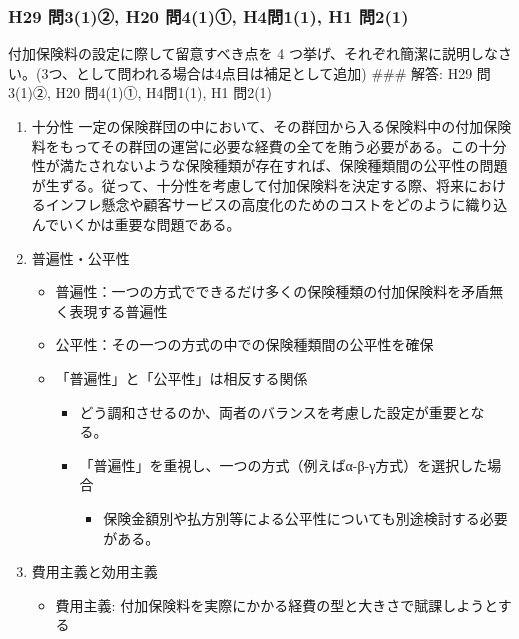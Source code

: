 \documentclass[
]{article}
\providecommand{\tightlist}{%
  \setlength{\itemsep}{0pt}\setlength{\parskip}{0pt}}
\begin{document}
\hypertarget{h29-ux554f31ux2461-h20-ux554f41ux2460-h4ux554f11-h1-ux554f21}{%
\subsubsection{H29 問3(1)②, H20 問4(1)①, H4問1(1), H1
問2(1)}\label{h29-ux554f31ux2461-h20-ux554f41ux2460-h4ux554f11-h1-ux554f21}}

付加保険料の設定に際して留意すべき点を 4
つ挙げ、それぞれ簡潔に説明しなさい。(3つ、として問われる場合は4点目は補足として追加)
\#\#\# 解答: H29 問3(1)②, H20 問4(1)①, H4問1(1), H1 問2(1)

\begin{enumerate}
\def\labelenumi{\arabic{enumi}.}
\tightlist
\item
  十分性
  一定の保険群団の中において、その群団から入る保険料中の付加保険料をもってその群団の運営に必要な経費の全てを賄う必要がある。この十分性が満たされないような保険種類が存在すれば、保険種類間の公平性の問題が生ずる。従って、十分性を考慮して付加保険料を決定する際、将来におけるインフレ懸念や顧客サービスの高度化のためのコストをどのように織り込んでいくかは重要な問題である。
\item
  普遍性・公平性

  \begin{itemize}
  \tightlist
  \item
    普遍性：一つの方式でできるだけ多くの保険種類の付加保険料を矛盾無く表現する普遍性
  \item
    公平性：その一つの方式の中での保険種類間の公平性を確保
  \item
    「普遍性」と「公平性」は相反する関係

    \begin{itemize}
    \tightlist
    \item
      どう調和させるのか、両者のバランスを考慮した設定が重要となる。
    \item
      「普遍性」を重視し、一つの方式（例えばα-β-γ方式）を選択した場合

      \begin{itemize}
      \tightlist
      \item
        保険金額別や払方別等による公平性についても別途検討する必要がある。
      \end{itemize}
    \end{itemize}
  \end{itemize}
\item
  費用主義と効用主義

  \begin{itemize}
  \tightlist
  \item
    費用主義: 付加保険料を実際にかかる経費の型と大きさで賦課しようとする


\end{itemize}
\end{enumerate}
\end{document}
